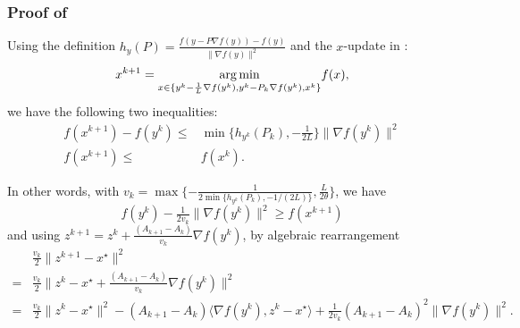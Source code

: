 \subsubsection{Proof of } \label{app:proof-osnes}
Using the definition $h_y (P) = \tfrac{f (y - P \nabla f (y)) - f (y)}{\| \nabla f (y) \|^2}$ and the $x$-update in :
\begin{equation*}
  x^{k+1} = \underset{x \in \{ y^k - \frac{1}{L} \nabla f (y^k), y^k
  - P_k \nabla f (y^k), x^k \}}{\argmin} f (x),
\end{equation*}
we have the following two inequalities:
\begin{align}
  f (x^{k + 1}) - f (y^k) \leq{} & \min \{ h_{y^k} (P_k), - \tfrac{1}{2 L}
  \} \| \nabla f (y^k) \|^2 \label{eqn:proof-3-1-1}\\
  f (x^{k + 1}) \leq{} & f (x^k). \label{eqn:proof-3-1-2}
\end{align}

In other words, with $v_k = \max \{ - \tfrac{1}{2 \min \{ h_{y^k} (P_k), - 1 / (2 L) \}},
   \tfrac{L}{2 \theta} \} $, we have
\begin{equation}
f (y^k) - \tfrac{1}{2 v_k} \| \nabla f (y^k) \|^2 \geq f (x^{k + 1})
  \label{eqn:proof-3-1-3}
\end{equation}
and using $z^{k+1} = z^k + \tfrac{(A_{k + 1} - A_k)}{v_k}
  \nabla f (y^k)$,  by algebraic rearrangement
\begin{align}
   & \tfrac{v_k}{2}\|z^{k+1} - x^\star\|^2 \\
  = {} & \tfrac{v_k}{2} \| z^k - x^{\star} + \tfrac{(A_{k + 1} - A_k)}{v_k}
  \nabla f (y^k) \|^2 \nonumber\\
  ={} & \tfrac{v_k}{2} \| z^k - x^{\star} \|^2 - (A_{k + 1} - A_k) \langle
  \nabla f (y^k), z^k - x^{\star} \rangle + \tfrac{1}{2 v_k} (A_{k + 1} -
  A_k)^2 \| \nabla f (y^k) \|^2 . \label{eqn:proof-3-1-aux-1}
\end{align}

